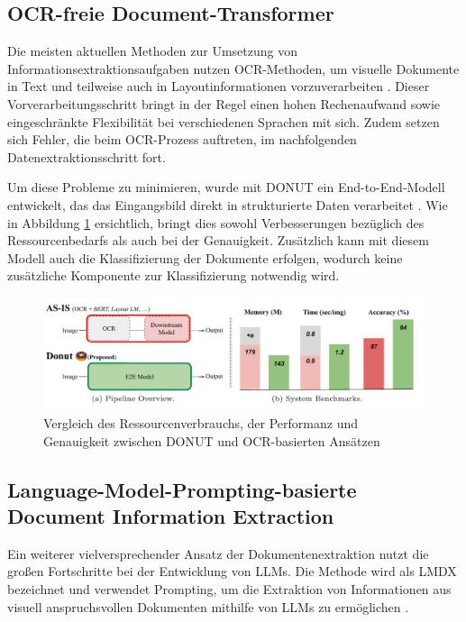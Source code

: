 \subsection{OCR-freie Document-Transformer}
\label{subsec:ocr-freie-document-transformer}

Die meisten aktuellen Methoden zur Umsetzung von Informationsextraktionsaufgaben nutzen \gls{OCR}-Methoden, um visuelle Dokumente in Text und teilweise auch in Layoutinformationen vorzuverarbeiten \cite{KimGeewook2022ODUT}. Dieser Vorverarbeitungsschritt bringt in der Regel einen hohen Rechenaufwand sowie eingeschränkte Flexibilität bei verschiedenen Sprachen mit sich. Zudem setzen sich Fehler, die beim \gls{OCR}-Prozess auftreten, im nachfolgenden Datenextraktionsschritt fort.

Um diese Probleme zu minimieren, wurde mit \gls{DONUT} ein End-to-End-Modell entwickelt, das das Eingangsbild direkt in strukturierte Daten verarbeitet \cite{KimGeewook2022ODUT}. Wie in Abbildung \ref{fig:donut-comparison} ersichtlich, bringt dies sowohl Verbesserungen bezüglich des Ressourcenbedarfs als auch bei der Genauigkeit. Zusätzlich kann mit diesem Modell auch die Klassifizierung der Dokumente erfolgen, wodurch keine zusätzliche Komponente zur Klassifizierung notwendig wird.

\begin{figure}[htb]
    \centering
    \includegraphics[width=\textwidth]{images/Donut_comparison.png}
    \caption{Vergleich des Ressourcenverbrauchs, der Performanz und Genauigkeit zwischen \gls{DONUT} und \gls{OCR}-basierten Ansätzen \cite{KimGeewook2022ODUT}}
    \label{fig:donut-comparison}
\end{figure}

\subsection{Language-Model-Prompting-basierte Document Information Extraction}
\label{subsec:language-model-basierte-document-information-extraction}

Ein weiterer vielversprechender Ansatz der Dokumentenextraktion nutzt die großen Fortschritte bei der Entwicklung von \glspl{LLM}. Die Methode wird als \gls{LMDX} bezeichnet und verwendet Prompting, um die Extraktion von Informationen aus visuell anspruchsvollen Dokumenten mithilfe von \glspl{LLM} zu ermöglichen \cite{PerotVincent2024LLMD}.

